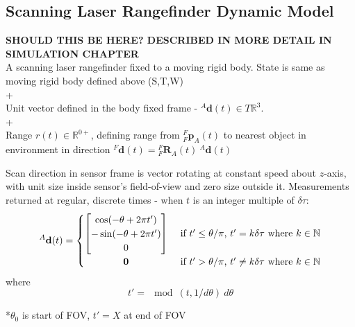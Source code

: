 	\subsection{Scanning Laser Rangefinder Dynamic Model}
		\textbf{SHOULD THIS BE HERE? DESCRIBED IN MORE DETAIL IN SIMULATION CHAPTER}\\
		A scanning laser rangefinder fixed to a moving rigid body. State is same as moving rigid body defined above (S,T,W)\\+\\
		Unit vector defined in the body fixed frame  - ${^{A}\mathbf{d}(t)} \in T\mathbb{R}^3$.\\+\\
		Range $r(t) \in \mathbb{R}^{0+}$, defining range from $^{F}_{F}\mathbf{p}^{}_{A}(t)$ to nearest object in environment in direction ${^{F}\mathbf{d}(t)} = {^{F}_{F}\mathbf{R}^{}_{A}(t)}\:{^{A}\mathbf{d}(t)}$
		
		Scan direction in sensor frame is vector rotating at constant speed about $z$-axis, with unit size inside sensor's field-of-view and zero size outside it. Measurements returned at regular, discrete times - when $t$ is an integer multiple of $\delta\tau$:
		\begin{equation}
		^{A}\mathbf{d}(t) =
			\begin{cases} 
			      \hfill \begin{bmatrix}
			      		\cos(-\theta + 2\pi t') \\
			      		-\sin(-\theta + 2\pi t') \\
			      		0
			      	\end{bmatrix}    \hfill & \text{ if $t' \leq \theta/\pi$, $t' = k\delta\tau$ where $k \in \mathbb{N}$} \\
			      \hfill \mathbf{0} \hfill & \text{ if $t' > \theta/\pi$, $t' \neq k\delta\tau$ where $k \in \mathbb{N}$} \\
			\end{cases} 
		\end{equation}
		where
		\begin{equation}
		t' = \mod(t,1/d\theta)\:d\theta
		\end{equation}
		
		*$\theta_0$ is start of FOV, $t'=X$ at end of FOV

